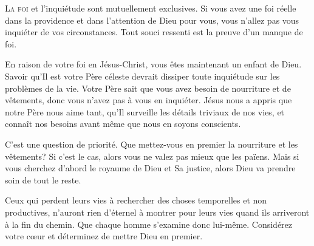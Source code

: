 




\lettrine{L}{a foi} et l'inquiétude sont mutuellement exclusives.
 Si vous avez une foi réelle dans la providence et dans l'attention
 de Dieu pour vous, vous n'allez pas vous inquiéter de vos circonstances.
 Tout souci ressenti est la preuve d'un manque de foi. 

En raison de votre foi en Jésus-Christ, vous êtes maintenant un enfant
 de Dieu. Savoir qu'Il est votre Père  céleste devrait dissiper
 toute inquiétude sur les problèmes de la vie. Votre Père sait que vous avez
 besoin de nourriture et de vêtements, donc vous n'avez pas à vous en
 inquiéter. Jésus nous a appris que notre Père nous aime tant,
 qu'Il surveille les détails triviaux de nos vies,
 et connaît nos besoins avant même que nous en soyons conscients. 

C'est une question de priorité. Que mettez-vous en premier
 \ocadr la nourriture et les vêtements? Si c'est le cas,
 alors vous ne valez pas mieux que les païens.
 Mais si vous cherchez d'abord le royaume de Dieu et Sa justice,
 alors Dieu va prendre soin de tout le reste. 


Ceux qui perdent leurs vies à rechercher des choses temporelles
 et non productives, n'auront rien d'éternel à montrer pour leurs vies
 quand ils arriveront à la fin du chemin. Que chaque homme
 s'examine donc lui-même. Considérez votre c\oe{}ur et déterminez
 de mettre Dieu en premier. 

\dvrule






